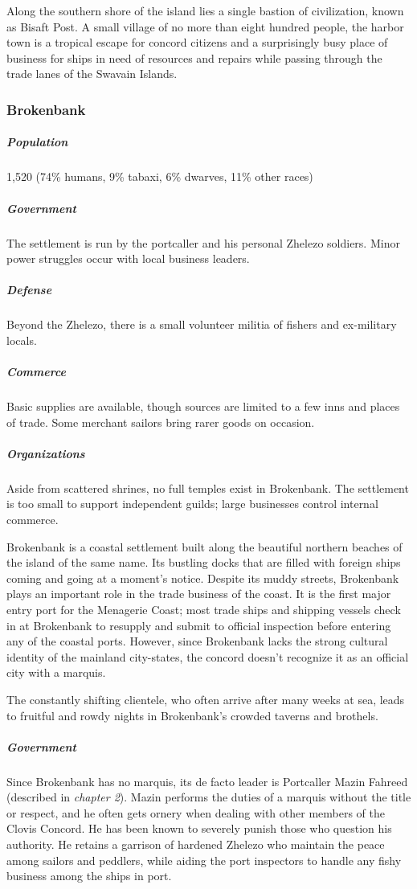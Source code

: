 \documentclass[10pt,a4paper,twoside,bg=print,twocolumn,openany,nodeprecatedcode]{dndbook}
\begin{document}
Along the southern shore of the island lies a single bastion of civilization, known as Bisaft Post. A small village of no more than eight hundred people, the harbor town is a tropical escape for concord citizens and a surprisingly busy place of business for ships in need of resources and repairs while passing through the trade lanes of the Swavain Islands.

\subsubsection{Brokenbank}
\subparagraph{Population}
1,520 (74\% humans, 9\% tabaxi, 6\% dwarves, 11\% other races)

\subparagraph{Government}
The settlement is run by the portcaller and his personal Zhelezo soldiers. Minor power struggles occur with local business leaders.

\subparagraph{Defense}
Beyond the Zhelezo, there is a small volunteer militia of fishers and ex-military locals.

\subparagraph{Commerce}
Basic supplies are available, though sources are limited to a few inns and places of trade. Some merchant sailors bring rarer goods on occasion.

\subparagraph{Organizations}
Aside from scattered shrines, no full temples exist in Brokenbank. The settlement is too small to support independent guilds; large businesses control internal commerce.

Brokenbank is a coastal settlement built along the beautiful northern beaches of the island of the same name. Its bustling docks that are filled with foreign ships coming and going at a moment's notice. Despite its muddy streets, Brokenbank plays an important role in the trade business of the coast. It is the first major entry port for the Menagerie Coast; most trade ships and shipping vessels check in at Brokenbank to resupply and submit to official inspection before entering any of the coastal ports. However, since Brokenbank lacks the strong cultural identity of the mainland city-states, the concord doesn't recognize it as an official city with a marquis.

The constantly shifting clientele, who often arrive after many weeks at sea, leads to fruitful and rowdy nights in Brokenbank's crowded taverns and brothels.

\subparagraph{Government}
Since Brokenbank has no marquis, its de facto leader is Portcaller Mazin Fahreed (described in \textit{chapter 2}). Mazin performs the duties of a marquis without the title or respect, and he often gets ornery when dealing with other members of the Clovis Concord. He has been known to severely punish those who question his authority. He retains a garrison of hardened Zhelezo who maintain the peace among sailors and peddlers, while aiding the port inspectors to handle any fishy business among the ships in port.
\end{document}
